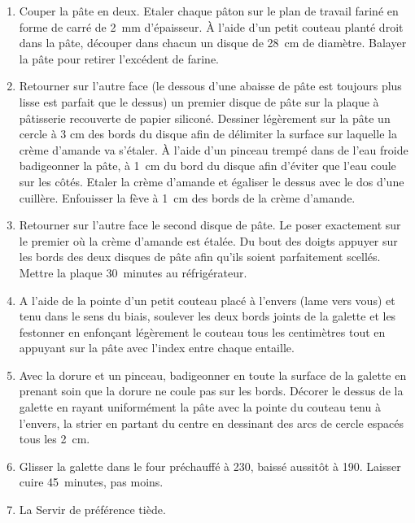 \begin{recipe}
  \begin{enumerate}

  \item Couper la pâte en deux. Etaler chaque pâton sur le plan de
    travail fariné en forme de carré de 2~mm d’épaisseur.  À l’aide
    d’un petit couteau planté droit dans la pâte, découper dans chacun
    un disque de 28~cm de diamètre.  Balayer la pâte pour retirer
    l’excédent de farine.

  \item Retourner sur l’autre face (le dessous d’une abaisse de pâte
    est toujours plus lisse est parfait que le dessus) un premier
    disque de pâte sur la plaque à pâtisserie recouverte de papier
    siliconé.  Dessiner légèrement sur la pâte un cercle à 3 cm des
    bords du disque afin de délimiter la surface sur laquelle la crème
    d’amande va s'étaler.  À l’aide d’un pinceau trempé dans de l’eau
    froide badigeonner la pâte, à 1~cm du bord du disque afin d’éviter
    que l’eau coule sur les côtés.  Etaler la crème d’amande et
    égaliser le dessus avec le dos d’une cuillère.  Enfouisser la fève
    à 1~cm des bords de la crème d’amande.

  \item Retourner sur l’autre face le second disque de pâte.  Le poser
    exactement sur le premier où la crème d’amande est étalée.  Du
    bout des doigts appuyer sur les bords des deux disques de pâte
    afin qu’ils soient parfaitement scellés. Mettre la plaque
    30~minutes au réfrigérateur.

  \item A l’aide de la pointe d’un petit couteau placé à l’envers
    (lame vers vous) et tenu dans le sens du biais, soulever les deux
    bords joints de la galette et les festonner en enfonçant
    légèrement le couteau tous les centimètres tout en appuyant sur la
    pâte avec l’index entre chaque entaille.

  \item Avec la dorure et un pinceau, badigeonner en toute la surface
    de la galette en prenant soin que la dorure ne coule pas sur les
    bords.  Décorer le dessus de la galette en rayant uniformément la
    pâte avec la pointe du couteau tenu à l’envers, la strier en
    partant du centre en dessinant des arcs de cercle espacés tous les
    2~cm.

  \item Glisser la galette dans le four préchauffé à 230\C, baissé
    aussitôt à 190\C. Laisser cuire 45~minutes, pas moins.

  \item La Servir de préférence tiède.

  \end{enumerate}
\end{recipe}

